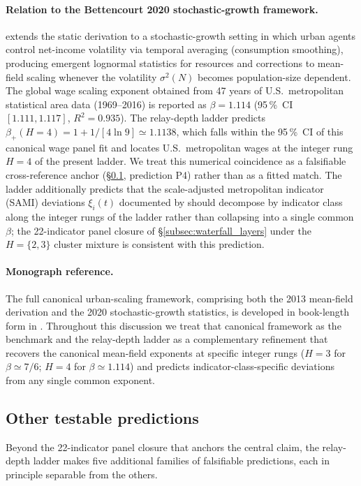 \paragraph{Relation to the Bettencourt 2020 stochastic-growth framework.}
\citet{Bettencourt2020SciAdv} extends the static derivation to a
stochastic-growth setting in which urban agents control net-income volatility
via temporal averaging (consumption smoothing), producing emergent lognormal
statistics for resources and corrections to mean-field scaling whenever the
volatility $\sigma^2(N)$ becomes population-size dependent.
The global wage scaling exponent obtained from 47 years of U.S.\ metropolitan
statistical area data (1969--2016) is reported as
$\beta=1.114$ (95\,\%~CI $[1.111,1.117]$, $R^2=0.935$).
The relay-depth ladder predicts $\beta_+(H{=}4)=1+1/[4\ln 9]\simeq 1.1138$,
which falls within the 95\,\%~CI of this canonical wage panel fit and
locates U.S.\ metropolitan wages at the integer rung $H{=}4$ of the present
ladder. We treat this numerical coincidence as a falsifiable cross-reference
anchor (\S\ref{subsec:other_predictions}, prediction P4) rather than as a
fitted match.
The ladder additionally predicts that the scale-adjusted metropolitan
indicator (SAMI) deviations $\xi_i(t)$ documented by
\citet{Bettencourt2020SciAdv} should decompose by indicator class
along the integer rungs of the ladder rather than collapsing into a single
common $\beta$; the 22-indicator panel closure of
\S\ref{subsec:waterfall_layers} under the $H{=}\{2,3\}$ cluster mixture
is consistent with this prediction.

\paragraph{Monograph reference.}
The full canonical urban-scaling framework, comprising both the 2013
mean-field derivation and the 2020 stochastic-growth statistics, is
developed in book-length form in
\cite{Bettencourt2021UrbanScience}.
Throughout this discussion we treat that canonical framework as the
benchmark and the relay-depth ladder as a complementary refinement
that recovers the canonical mean-field exponents at specific integer rungs
($H{=}3$ for $\beta\simeq 7/6$; $H{=}4$ for $\beta\simeq 1.114$) and
predicts indicator-class-specific deviations from any single common
exponent.

\subsection{Other testable predictions}\label{subsec:other_predictions}
Beyond the 22-indicator panel closure that anchors the central claim,
the relay-depth ladder makes five additional families of falsifiable
predictions, each in principle separable from the others.

